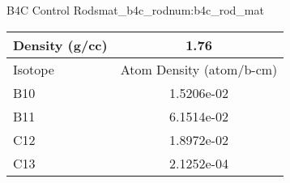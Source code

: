 \begin{matitem}{B4C Control Rods}{mat_b4c_rod}{num:b4c_rod_mat}
  \centering
  \begin{tabular}{l c}
    \toprule
    Density (g/cc) & 1.76 \\
    \midrule
    Isotope & Atom Density (atom/b-cm) \\
    \midrule
    \midrule
B10 & 1.5206e-02 \\
B11 & 6.1514e-02 \\
C12 & 1.8972e-02 \\
C13 & 2.1252e-04 \\

    \bottomrule
  \end{tabular}
\end{matitem}
